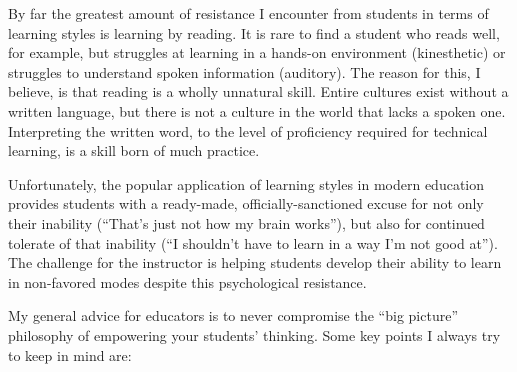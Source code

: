 By far the greatest amount of resistance I encounter from students in terms of learning styles is learning by reading.  It is rare to find a student who reads well, for example, but struggles at learning in a hands-on environment (kinesthetic) or struggles to understand spoken information (auditory).  The reason for this, I believe, is that reading is a wholly unnatural skill.  Entire cultures exist without a written language, but there is not a culture in the world that lacks a spoken one.  Interpreting the written word, to the level of proficiency required for technical learning, is a skill born of much practice.

Unfortunately, the popular application of learning styles in modern education provides students with a ready-made, officially-sanctioned excuse for not only their inability (``That's just not how my brain works''), but also for continued tolerate of that inability (``I shouldn't have to learn in a way I'm not good at'').  The challenge for the instructor is helping students develop their ability to learn in non-favored modes despite this psychological resistance.

\vskip 10pt

\filbreak

My general advice for educators is to never compromise the ``big picture'' philosophy of empowering your students' thinking.  Some key points I always try to keep in mind are:


